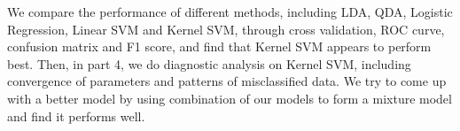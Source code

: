 \documentclass[11pt]{article}
\begin{document}
\quad We compare the performance of different methods, including LDA, QDA, Logistic Regression, Linear SVM and Kernel SVM, through cross validation, ROC curve, confusion matrix and F1 score, and find that Kernel SVM appears to perform best. Then, in part 4, we do diagnostic analysis on Kernel SVM, including convergence of parameters and patterns of misclassified data. We try to come up with a better model by using combination of our models to form a mixture model and find it performs well.







\renewcommand\refname{} 
 

\end{document}
